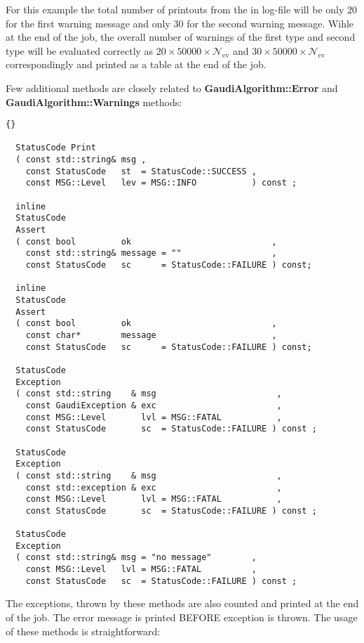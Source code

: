 \documentclass{lhcbnote}
\newcommand{\bftt}         {\ttfamily\bfseries}
\begin{document}
For this example the total number of printouts from the in log-file
will be only 20 for the first warning message and only 30 for the second
warning message. Wihle at the end of the job, the overall
number of warnings of the first type and second type will
be evaluated correctly as
$20\times50000\times{\mathcal{N}}_{\mathrm{ev}}$ and
$30\times50000\times{\mathcal{N}}_{\mathrm{ev}}$
correspondingly and printed as a table at the end of the job.


Few additional methods are closely related to
{\bftt{GaudiAlgorithm::Error}} and
{\bftt{GaudiAlgorithm::Warnings}} methods:

\begin{scriptsize}
 \begin{lstlisting}{}

  StatusCode Print
  ( const std::string& msg ,
    const StatusCode   st  = StatusCode::SUCCESS ,
    const MSG::Level   lev = MSG::INFO           ) const ;

  inline
  StatusCode
  Assert
  ( const bool         ok                            ,
    const std::string& message = ""                  ,
    const StatusCode   sc      = StatusCode::FAILURE ) const;

  inline
  StatusCode
  Assert
  ( const bool         ok                            ,
    const char*        message                       ,
    const StatusCode   sc      = StatusCode::FAILURE ) const;

  StatusCode
  Exception
  ( const std::string    & msg                        ,
    const GaudiException & exc                        ,
    const MSG::Level       lvl = MSG::FATAL           ,
    const StatusCode       sc  = StatusCode::FAILURE ) const ;

  StatusCode
  Exception
  ( const std::string    & msg                        ,
    const std::exception & exc                        ,
    const MSG::Level       lvl = MSG::FATAL           ,
    const StatusCode       sc  = StatusCode::FAILURE ) const ;

  StatusCode
  Exception
  ( const std::string& msg = "no message"        ,
    const MSG::Level   lvl = MSG::FATAL          ,
    const StatusCode   sc  = StatusCode::FAILURE ) const ;

 \end{lstlisting}
\end{scriptsize}

The exceptions, thrown by these methods are also counted
and printed at the end of the job. The error message is
printed BEFORE exception is thrown. The usage of these
methods is straightforward:
\end{document}
